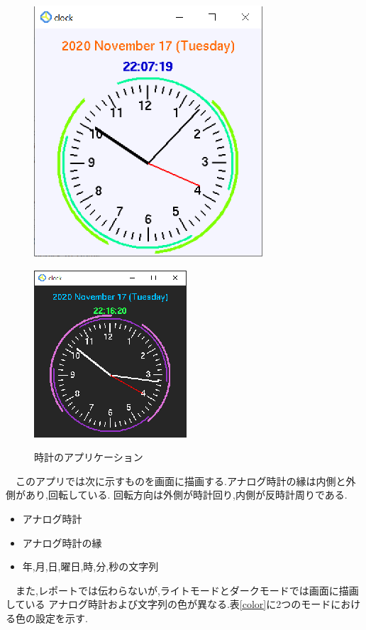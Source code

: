 \documentclass[a4j]{jarticle}
\begin{document}
        \begin{figure}[H]
          \begin{minipage}{0.5\hsize}
           \begin{center}
            \includegraphics[scale=1.2]{light.eps}
           \end{center}
           \label{light}
          \end{minipage}
          \begin{minipage}{0.5\hsize}
           \begin{center}
            \includegraphics[scale=1.8]{dark.eps}
           \end{center}
           \label{dark}
          \end{minipage}
          \caption{時計のアプリケーション}
          \label{clock}
         \end{figure}

         　このアプリでは次に示すものを画面に描画する.アナログ時計の縁は内側と外側があり,回転している.
         回転方向は外側が時計回り,内側が反時計周りである.
         \begin{itemize}
          \item アナログ時計
          \item アナログ時計の縁
          \item 年,月,日,曜日,時,分,秒の文字列 
        \end{itemize}
         　また,レポートでは伝わらないが,ライトモードとダークモードでは画面に描画している
         アナログ時計および文字列の色が異なる.表\ref{color}に2つのモードにおける色の設定を示す.
\end{document}
